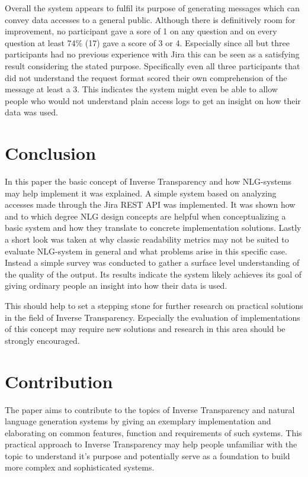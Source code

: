 \documentclass[sigconf,obeyspaces]{acmart}
\begin{document}
Overall the system appears to fulfil its purpose of generating messages which can convey data accesses to a general public. Although there is definitively room for improvement, no participant gave a sore of 1 on any question and on every question at least 74\% (17) gave a score of 3 or 4. Especially since all but three participants had no previous experience with Jira this can be seen as a satisfying result considering the stated purpose. Specifically even all three participants that did not understand the request format scored their own comprehension of the message at least a 3. This indicates the system might even be able to allow people who would not understand plain access logs to get an insight on how their data was used.

\section{Conclusion}
In this paper the basic concept of Inverse Transparency and how NLG-systems may help implement it was explained. A simple system based on analyzing accesses made through the Jira REST API was implemented. It was shown how and to which degree NLG design concepts are helpful when conceptualizing a basic system and how they translate to concrete implementation solutions. Lastly a short look was taken at why classic readability metrics may not be suited to evaluate NLG-system in general and what problems arise in this specific case. Instead a simple survey was conducted to gather a surface level understanding of the quality of the output. Its results indicate the system likely achieves its goal of giving ordinary people an insight into how their data is used. 

This should help to set a stepping stone for further research on practical solutions in the field of Inverse Transparency. Especially the evaluation of implementations of this concept may require new solutions and research in this area should be strongly encouraged.


\section{Contribution}
The paper aims to contribute to the topics of Inverse Transparency and natural language generation systems by giving an exemplary implementation and elaborating on common features, function and requirements of such systems. This practical approach to Inverse Transparency may help people unfamiliar with the topic to understand it's purpose and potentially serve as a foundation to build more complex and sophisticated systems.
\end{document}
